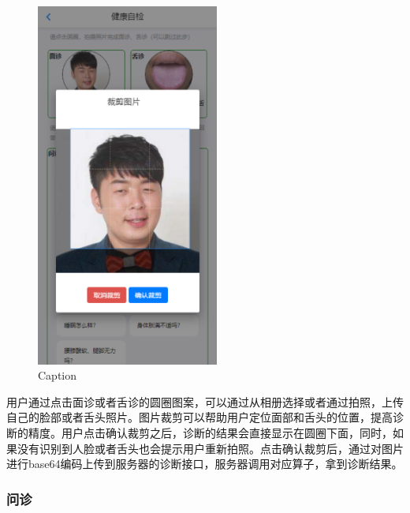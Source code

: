 \begin{figure}[ht]
    \centering
    \includegraphics[height=12cm]{images/crop.png}
    \caption{Caption}
    \label{fig:crop}
\end{figure}
用户通过点击面诊或者舌诊的圆圈图案，可以通过从相册选择或者通过拍照，上传自己的脸部或者舌头照片。图片裁剪可以帮助用户定位面部和舌头的位置，提高诊断的精度。用户点击确认裁剪之后，诊断的结果会直接显示在圆圈下面，同时，如果没有识别到人脸或者舌头也会提示用户重新拍照。点击确认裁剪后，通过对图片进行base64编码上传到服务器的诊断接口，服务器调用对应算子，拿到诊断结果。

\subsubsection{问诊}

